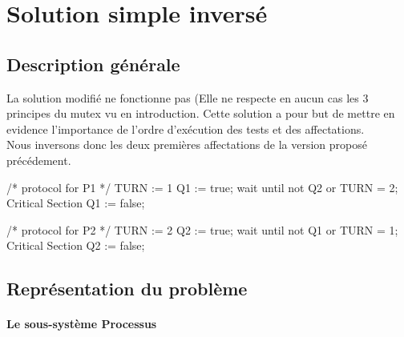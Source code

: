 \documentclass[a4paper]{report}
\begin{document}
\section{Solution simple inversé}
\subsection{Description générale}
La solution modifié ne fonctionne pas (Elle ne respecte en aucun cas les 3 principes du mutex vu en introduction. Cette solution a pour but de mettre en evidence l'importance de l'ordre d'exécution des tests et des affectations. \\
Nous inversons donc les deux premières affectations de la version proposé précédement.
\smallbreak
\begin{minipage}{0.5\textwidth}
\flushleft
\renewcommand{\verbatimtabsize}{3}
\begin{listing}[1]{1}
/* protocol for P1 */
TURN := 1
Q1 := true;
wait until not Q2 or TURN = 2;
Critical Section
Q1 := false;
\end{listing}
\renewcommand{\verbatimtabsize}{3}
\end{minipage}
\begin{minipage}{0.5\textwidth}
\flushright
\begin{listing}[1]{1}
/* protocol for P2 */
TURN := 2
Q2 := true;
wait until not Q1 or TURN = 1;
Critical Section
Q2 := false;
\end{listing}
\end{minipage}

\subsection{Représentation du problème}
\paragraph{Le sous-système Processus}
\hfill\break
\end{document}
